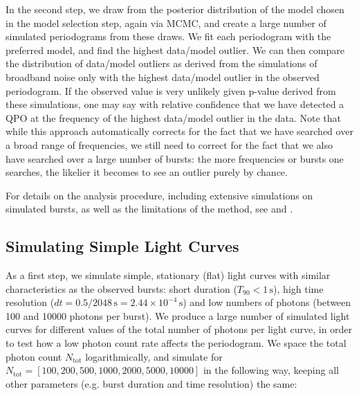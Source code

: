 \documentclass[numberedappendix]{emulateapj}
\begin{document}
In the second step, we draw from the posterior distribution of the model chosen in the model selection step, again via MCMC, and create a large number of simulated periodograms from these draws. We fit each periodogram with the preferred model, and find the highest data/model outlier. We can then compare the distribution of data/model outliers as derived from the simulations of broadband noise only with the highest data/model outlier in the observed periodogram. If the observed value is very unlikely given p-value derived from these simulations, one may say with relative confidence that we have detected a QPO at the frequency of the highest data/model outlier in the data. Note that while this approach automatically corrects for the fact that we have searched over a broad range of frequencies, we still need to correct for the fact that we also have searched over a large number of bursts: the more frequencies or bursts one searches, the likelier it becomes to see an outlier purely by chance. 

For details on the analysis procedure, including extensive simulations on simulated bursts, as well as the limitations of the method, see \citet{huppenkothen13} and \citet{vaughan2010}.


\subsection{Simulating Simple Light Curves}
\label{sec:analysis_lcsims}
As a first step, we simulate simple, stationary (flat) light curves with similar characteristics as the observed bursts: short duration ($T_{90} < 1 \, \mathrm{s}$), high time resolution ($dt = 0.5/2048 \, \mathrm{s} = 2.44\times 10^{-4} \, \mathrm{s}$) and low numbers of photons (between 100 and 10000 photons per burst). 
We produce a large number of simulated light curves for different values of the total number of photons per light curve, in order to test how a low photon count rate affects the periodogram. We space the total photon count $N_{\mathrm{tot}}$ logarithmically, and simulate for $N_{\mathrm{tot}} = [100, 200, 500, 1000, 2000, 5000, 10000]$ in the following way, keeping all other parameters (e.g. burst duration and time resolution) the same:
\end{document}
